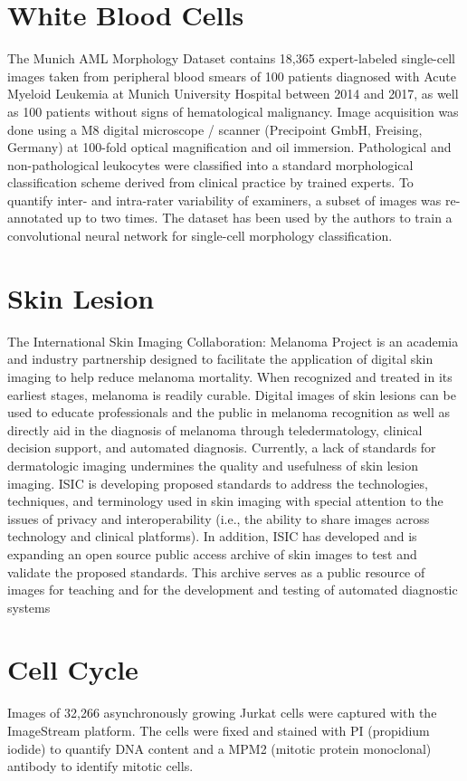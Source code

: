 \section{White Blood Cells}

The Munich AML Morphology Dataset contains 18,365 expert-labeled single-cell images taken from peripheral blood smears of 100 patients diagnosed with Acute Myeloid Leukemia at Munich University Hospital between 2014 and 2017, as well as 100 patients without signs of hematological malignancy. Image acquisition was done using a M8 digital microscope / scanner (Precipoint GmbH, Freising, Germany) at 100-fold optical magnification and oil immersion. Pathological and non-pathological leukocytes were classified into a standard morphological classification scheme derived from clinical practice by trained experts. To quantify inter- and intra-rater variability of examiners, a subset of images was re-annotated up to two times. The dataset has been used by the authors to train a convolutional neural network for single-cell morphology classification.

\section{Skin Lesion}

The International Skin Imaging Collaboration: Melanoma Project is an academia and industry partnership designed to facilitate the application of digital skin imaging to help reduce melanoma mortality. When recognized and treated in its earliest stages, melanoma is readily curable. Digital images of skin lesions can be used to educate professionals and the public in melanoma recognition as well as directly aid in the diagnosis of melanoma through teledermatology, clinical decision support, and automated diagnosis. Currently, a lack of standards for dermatologic imaging undermines the quality and usefulness of skin lesion imaging. ISIC is developing proposed standards to address the technologies, techniques, and terminology used in skin imaging with special attention to the issues of privacy and interoperability (i.e., the ability to share images across technology and clinical platforms). In addition, ISIC has developed and is expanding an open source public access archive of skin images to test and validate the proposed standards. This archive serves as a public resource of images for teaching and for the development and testing of automated diagnostic systems

\section{Cell Cycle}

Images of 32,266 asynchronously growing Jurkat cells were captured with the ImageStream platform. The cells were fixed and stained with PI (propidium iodide) to quantify DNA content and a MPM2 (mitotic protein monoclonal) antibody to identify mitotic cells.